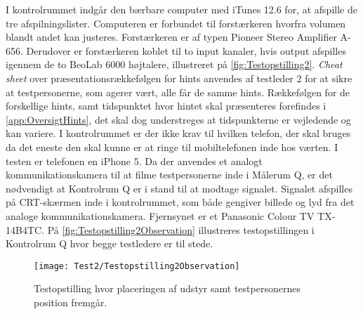 %
I kontrolrummet indgår den bærbare computer med iTunes 12.6 for, at afspille de tre afspilningslister. Computeren er forbundet til forstærkeren hvorfra volumen blandt andet kan justeres. Forstærkeren er af typen Pioneer Stereo Amplifier A-656. Derudover er forstærkeren koblet til to input kanaler, hvis output afspilles igennem de to BeoLab 6000 højtalere, illustreret på \autoref{fig:Testopstilling2}. \textit{Cheat sheet} over præsentationsrækkefølgen for hints anvendes af testleder 2 for at sikre at testpersonerne, som agerer vært, alle får de samme hints. Rækkefølgen for de forskellige hints, samt tidspunktet hvor hintet skal præsenteres forefindes i \autoref{app:OversigtHints}, det skal dog understreges at tidspunkterne er vejledende og kan variere. I kontrolrummet er der ikke krav til hvilken telefon, der skal bruges da det eneste den skal kunne er at ringe til mobiltelefonen inde hos værten. I testen er telefonen en iPhone 5. Da der anvendes et analogt kommunikationskamera til at filme testpersonerne inde i Målerum Q, er det nødvendigt at Kontrolrum Q er i stand til at modtage signalet. Signalet afspilles på CRT-skærmen inde i kontrolrummet, som både gengiver billede og lyd fra det analoge kommunikationskamera. Fjernsynet er et Panasonic Colour TV TX-14B4TC. På \autoref{fig:Testopstilling2Observation} illustreres testopstillingen i Kontrolrum Q hvor begge testledere er til stede.   
%
\begin{figure}[H]
	\centering
	\texttt{[image: Test2/Testopstilling2Observation]}
	\caption{Testopstilling hvor placeringen af udstyr samt testpersonernes position fremgår.}
	\label{fig:Testopstilling2Observation}
\end{figure}
\noindent
% 


